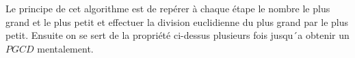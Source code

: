 
Le principe de cet algorithme est de repérer à chaque étape le nombre le plus grand et le plus petit et effectuer la division euclidienne du plus grand par le plus petit. Ensuite on se sert de la propriété ci-dessus plusieurs fois jusqu´a obtenir un $PGCD$ mentalement.

